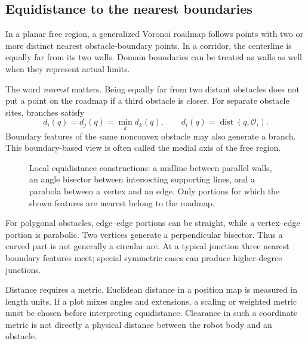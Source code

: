 \subsection{Equidistance to the nearest boundaries}
In a planar free region, a generalized Voronoi roadmap follows points with
two or more distinct nearest obstacle-boundary points. In a corridor,
the centerline is equally far from its two walls. Domain boundaries can
be treated as walls as well when they represent actual limits.

The word \emph{nearest} matters. Being equally far from two distant
obstacles does not put a point on the roadmap if a third obstacle is
closer. For separate obstacle sites, branches satisfy
\[
 d_i(q)=d_j(q)=\min_k d_k(q),\qquad
 d_i(q)=\operatorname{dist}(q,\mathcal O_i).
\]
Boundary features of the same nonconvex obstacle may also generate a
branch. This boundary-based view is often called the medial axis of the
free region.

\begin{figure}[htbp]
\centering
\caption{Local equidistance constructions: a midline between parallel
walls, an angle bisector between intersecting supporting lines, and a
parabola between a vertex and an edge. Only portions for which the shown
features are nearest belong to the roadmap.}
\label{fig:l13-features}
\end{figure}

For polygonal obstacles, edge--edge portions can be straight, while a
vertex--edge portion is parabolic. Two vertices generate a perpendicular
bisector. Thus a curved part is not generally a circular arc. At a typical
junction three nearest boundary features meet; special symmetric cases
can produce higher-degree junctions.

Distance requires a metric. Euclidean distance in a position map is
measured in length units. If a plot mixes angles and extensions, a scaling
or weighted metric must be chosen before interpreting equidistance.
Clearance in such a coordinate metric is not directly a physical distance
between the robot body and an obstacle.


